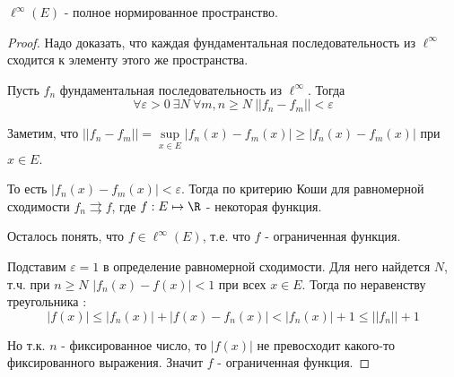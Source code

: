 \begin{theorem} $\ell^{\infty}(E)$ - полное нормированное пространство. \thmslashn
	
	\begin{proof} \thmslashn
		
		Надо доказать, что каждая фундаментальная последовательность из $\ell^{\infty}$ сходится к элементу этого же пространства.
		
		Пусть $f_n$ фундаментальная последовательность из $\ell^{\infty}$. Тогда
		\[\forall \varepsilon > 0 \: \exists N \: \forall m,n \ge N \: || f_n - f_m|| < \varepsilon \]
		
		Заметим, что $|| f_n - f_m || = \sup\limits_{x \in E}|f_n(x) - f_m(x) | \ge |f_n(x) - f_m(x)|$ при $x \in E$.
		
		То есть $|f_n(x) - f_m(x)| < \varepsilon$. Тогда по критерию Коши для равномерной сходимости $f_n \rightrightarrows f$, где $f : E \mapsto \R$ - некоторая функция.
		
		Осталось понять, что $f \in \ell^{\infty}(E)$, т.е. что $f$ - ограниченная функция.
		
		Подставим $\varepsilon = 1$ в определение равномерной сходимости. Для него найдется $N$, т.ч. при $n \ge N$ $|f_n(x) - f(x)| < 1$ при всех $x \in E$. Тогда по неравенству треугольника : 
		\[|f(x)| \le |f_n(x)| + |f(x) - f_n(x)| < |f_n(x)| + 1 \le ||f_n|| + 1\]
		
		Но т.к. $n$ - фиксированное число, то $|f(x)|$ не превосходит какого-то фиксированного выражения. Значит $f$ - ограниченная функция.
 	\end{proof}
\end{theorem}